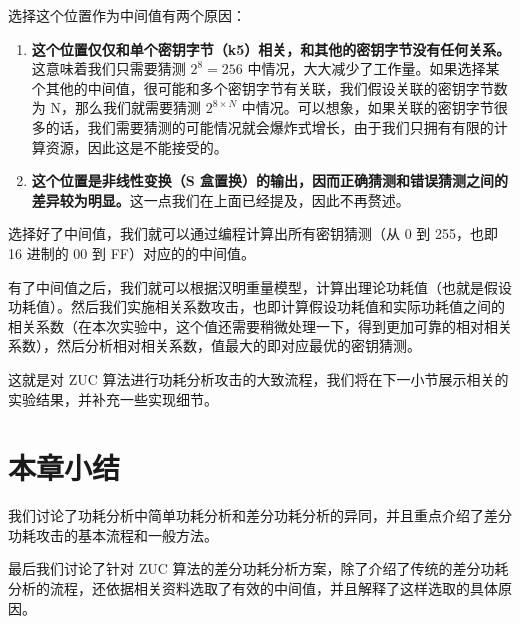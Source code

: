 选择这个位置作为中间值有两个原因：

\begin{enumerate}
    \item \textbf{这个位置仅仅和单个密钥字节（k5）相关，和其他的密钥字节没有任何关系。}这意味着我们只需要猜测 $2^8=256$ 中情况，大大减少了工作量。如果选择某个其他的中间值，很可能和多个密钥字节有关联，我们假设关联的密钥字节数为 N，那么我们就需要猜测 $2^{8 \times N}$ 中情况。可以想象，如果关联的密钥字节很多的话，我们需要猜测的可能情况就会爆炸式增长，由于我们只拥有有限的计算资源，因此这是不能接受的。
    \item \textbf{这个位置是非线性变换（S 盒置换）的输出，因而正确猜测和错误猜测之间的差异较为明显。}这一点我们在上面已经提及，因此不再赘述。
\end{enumerate}

\vspace*{\baselineskip}

选择好了中间值，我们就可以通过编程计算出所有密钥猜测（从 0 到 255，也即 16 进制的 00 到 FF）对应的的中间值。

有了中间值之后，我们就可以根据汉明重量模型，计算出理论功耗值（也就是假设功耗值）。然后我们实施相关系数攻击，也即计算假设功耗值和实际功耗值之间的相关系数（在本次实验中，这个值还需要稍微处理一下，得到更加可靠的相对相关系数），然后分析相对相关系数，值最大的即对应最优的密钥猜测。

这就是对 ZUC 算法进行功耗分析攻击的大致流程，我们将在下一小节展示相关的实验结果，并补充一些实现细节。

\section{本章小结}




我们讨论了功耗分析中简单功耗分析和差分功耗分析的异同，并且重点介绍了差分功耗攻击的基本流程和一般方法。

最后我们讨论了针对 ZUC 算法的差分功耗分析方案，除了介绍了传统的差分功耗分析的流程，还依据相关资料选取了有效的中间值，并且解释了这样选取的具体原因。